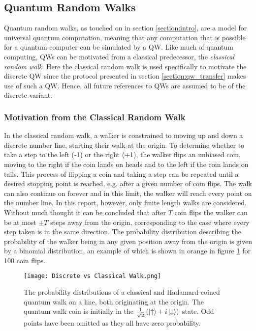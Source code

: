 \subsection{Quantum Random Walks}
Quantum random walks, as touched on in section \ref{section:intro}, are a model for universal quantum computation, meaning that any computation that is possible for a quantum computer can be simulated by a QW.
Like much of quantum computing, QWs can be motivated from a classical predecessor, the \emph{classical random walk}.
Here the classical random walk is used specifically to motivate the discrete QW since the protocol presented in section \ref{section:qw_transfer} makes use of such a QW.
Hence, all future references to QWs are assumed to be of the discrete variant.

\subsubsection{Motivation from the Classical Random Walk}
\label{subsubsection:classc_r_w}
In the classical random walk, a walker is constrained to moving up and down a discrete number line, starting their walk at the origin.
To determine whether to take a step to the left (-1) or the right (+1), the walker flips an unbiased coin, moving to the right if the coin lands on heads and to the left if the coin lands on tails. 
This process of flipping a coin and taking a step can be repeated until a desired stopping point is reached, e.g. after a given number of coin flips.
The walk can also continue on forever and in this limit, the walker will reach every point on the number line.
In this report, however, only finite length walks are considered.
Without much thought it can be concluded that after $T$ coin flips the walker can be at most $\pm T$ steps away from the origin, corresponding to the case where every step taken is in the same direction.
The probability distribution describing the probability of the walker being in any given position away from the origin is given by a binomial distribution, an example of which is shown in orange in figure \ref{fig:discVSclass} for 100 coin flips.

\begin{figure}
    \centering
    \texttt{[image: Discrete vs Classical Walk.png]}
    \caption{The probability distributions of a classical and Hadamard-coined quantum walk on a line, both originating at the origin. The quantum walk coin is initially in the $\frac{1}{\sqrt{2}}\left(\ket{\uparrow} + i\ket{\downarrow}\right)$ state. Odd points have been omitted as they all have zero probability.}
    \label{fig:discVSclass}
\end{figure}

